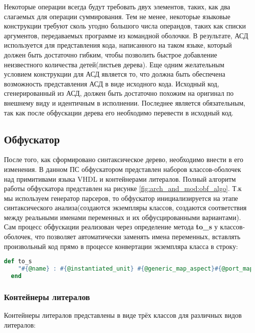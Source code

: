 Некоторые операции всегда будут требовать двух элементов, таких, как два слагаемых для операции суммирования. Тем не менее, некоторые языковые конструкции требуют сколь угодно большого числа операндов, таких как списки аргументов, передаваемых программе из командной оболочки. В результате, АСД используется для представления кода, написанного на таком языке, который должен быть достаточно гибким, чтобы позволить быстрое добавление неизвестного количества детей(листьев дерева).
Еще одним желательным условием конструкции для АСД является то, что должна быть обеспечена возможность представления АСД в виде исходного кода. Исходный код, сгенерированный из АСД, должен быть достаточно похожим на оригинал по внешнему виду и идентичным в исполнении. Последнее является обязательным, так как после обфускации дерева его необходимо перевести в исходный код.

\subsection{Обфускатор}
\label{sub:arch_and_mod:grammars}

После того, как сформировано синтаксическое дерево, необходимо внести в его изменения. В данном ПС обфускатором представлен наборов классов-оболочек над примитивами языка VHDL и контейнерами литералов. Полный алгоритм работы обфускатора представлен на рисунке \ref{fig:arch_and_mod:obf_algo}.
Т.к мы используем генератор парсеров, то обфускатор инициализируется на этапе синтаксического анализа(создаются экземпляры классов, создаются соответствия между реальными именами переменных и их обфусцированными вариантами). Сам процесс обфускации реализован через определение метода \textbf{to\_s}  у классов-оболочек, что позволяет автоматически заменять имена переменных, вставлять произвольный код прямо в процессе конвертации экземпляра класса в строку:

\begin{lstlisting}[language=Ruby, style=rubystyle,caption={Определение метода перевода класса в строку для примитива component instantiation}, label=lst:arch_and_mod:wrapper_to_s]
  def to_s
    "#{@name} : #{@instantiated_unit} #{@generic_map_aspect}#{@port_map_aspect ? '' : ';'}#{@port_map_aspect}"
  end
\end{lstlisting}


\subsubsection{Контейнеры литералов}
  Контейнеры литералов представлены в виде трёх классов для различных видов литералов:
  \clearpage

